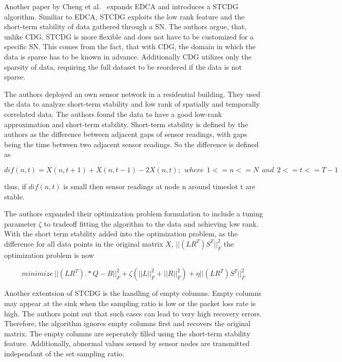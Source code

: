 \par

Another paper by Cheng et al.~\cite{cheng2013stcdg} expands \ac{EDCA} and
introduces a \ac{STCDG} algorithm. Similiar to \ac{EDCA}, \ac{STCDG} exploits
the low rank feature and the short-term stability of data gathered through a
\ac{SN}. The authors argue, that, unlike \ac{CDG}, \ac{STCDG} is more flexible
and does not have to be customized for a specific \ac{SN}. This comes from the
fact, that with \ac{CDG}, the domain in which the data is sparse has to be
known in advance. Additionally \ac{CDG} utilizes only the sparsity of data,
requiring the full dataset to be reordered if the data is not sparse.

The authors deployed an own sensor network in a residential building. They used
the data to analyze short-term stability and low rank of spatially and
temporally correlated data. The authors found the data to have a good low-rank
approximation and short-term stability. Short-term stability is defined by the
authors as the difference between adjacent gaps of sensor readings, with gaps
being the time between two adjacent sensor readings. So the difference is
defined as 

$$
dif(n,t) = X(n,t + 1) + X(n,t - 1) - 2X(n, t); \ \ where  \ \ 1 <= n <= N  \ \ and  \ \ 2 <= t <= T - 1
$$

thus, if $ dif(n, t) $ is small then sensor readings at node n around timeslot
t are stable.

The authors expanded their optimization problem formulation to include a tuning
parameter $ \zeta $ to tradeoff fitting the algorithm to the data and achieving
low rank. With the short term stability added into the optimization problem, as
the difference for all data points in the original matrix $ X $, $
||(LR^T)S^T||^2_F $ the optimization problem is now

$$
minimize \ ||(LR^T).*Q-B||^2_F + \zeta(||L||^2_F + ||R||^2_F) + \eta ||(LR^T)S^T||^2_F
$$

Another extentsion of \ac{STCDG} is the handling of empty columns. Empty
columns may appear at the sink when the sampling ratio is low or the packet
loss rate is high. The authors point out that such cases can lead to very high
recovery errors. Therefore, the algorithm ignores empty columns first and
recovers the original matrix. The empty columns are seperately filled using the
short-term stability feature. Additionally, abnormal values sensed by sensor
nodes are transmitted independant of the set sampling ratio.


